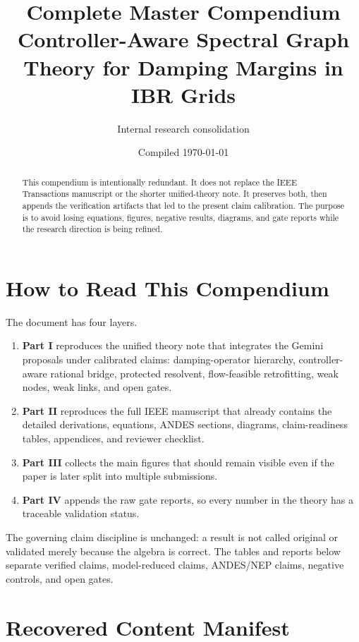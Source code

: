 \documentclass[11pt]{article}
\title{\textbf{Complete Master Compendium}\\
Controller-Aware Spectral Graph Theory for Damping Margins in IBR Grids}
\author{Internal research consolidation}
\date{Compiled \today}
\begin{document}
\maketitle

\begin{abstract}
This compendium is intentionally redundant.  It does not replace the IEEE
Transactions manuscript or the shorter unified-theory note.  It preserves both,
then appends the verification artifacts that led to the present claim
calibration.  The purpose is to avoid losing equations, figures, negative
results, diagrams, and gate reports while the research direction is being
refined.
\end{abstract}

\tableofcontents
\clearpage

\section*{How to Read This Compendium}

The document has four layers.

\begin{enumerate}
\item \textbf{Part I} reproduces the unified theory note that integrates the
Gemini proposals under calibrated claims: damping-operator hierarchy,
controller-aware rational bridge, protected resolvent, flow-feasible
retrofitting, weak nodes, weak links, and open gates.
\item \textbf{Part II} reproduces the full IEEE manuscript that already contains
the detailed derivations, equations, ANDES sections, diagrams, claim-readiness
tables, appendices, and reviewer checklist.
\item \textbf{Part III} collects the main figures that should remain visible
even if the paper is later split into multiple submissions.
\item \textbf{Part IV} appends the raw gate reports, so every number in the
theory has a traceable validation status.
\end{enumerate}

The governing claim discipline is unchanged: a result is not called original or
validated merely because the algebra is correct.  The tables and reports below
separate verified claims, model-reduced claims, ANDES/NEP claims, negative
controls, and open gates.

\section*{Recovered Content Manifest}
\end{document}
